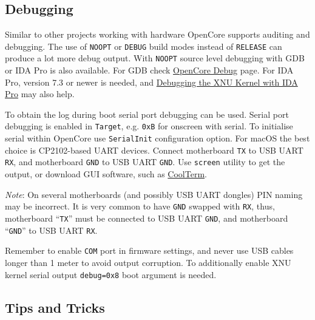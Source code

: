\documentclass[]{article}
\begin{document}
\subsection{Debugging}\label{troubleshootingdebug}

Similar to other projects working with hardware OpenCore supports auditing and debugging.
The use of \texttt{NOOPT} or \texttt{DEBUG} build modes instead of \texttt{RELEASE}
can produce a lot more debug output. With \texttt{NOOPT} source level debugging with
GDB or IDA Pro is also available. For GDB check
\href{https://github.com/acidanthera/OpenCorePkg/tree/master/Debug}{OpenCore Debug}
page. For IDA Pro, version 7.3 or newer is needed, and
\href{https://www.hex-rays.com/products/ida/support/tutorials/index.shtml}{Debugging the XNU Kernel with IDA Pro}
may also help.

To obtain the log during boot serial port debugging can be used. Serial port
debugging is enabled in \texttt{Target}, e.g. \texttt{0xB} for onscreen with serial. To
initialise serial within OpenCore use \texttt{SerialInit} configuration option.
For macOS the best choice is CP2102-based UART devices. Connect motherboard \texttt{TX}
to USB UART \texttt{RX}, and motherboard \texttt{GND} to USB UART \texttt{GND}. Use
\texttt{screen} utility to get the output, or download GUI software, such as
\href{https://freeware.the-meiers.org}{CoolTerm}.

\emph{Note}: On several motherboards (and possibly USB UART dongles) PIN naming may be
incorrect. It is very common to have \texttt{GND} swapped with \texttt{RX}, thus,
motherboard ``\texttt{TX}'' must be connected to USB UART \texttt{GND}, and motherboard ``\texttt{GND}''
to USB UART \texttt{RX}.

Remember to enable \texttt{COM} port in firmware settings, and never use USB cables longer
than 1 meter to avoid output corruption. To additionally enable XNU kernel serial output
\texttt{debug=0x8} boot argument is needed.

\subsection{Tips and Tricks}\label{troubleshootingtricks}
\end{document}
